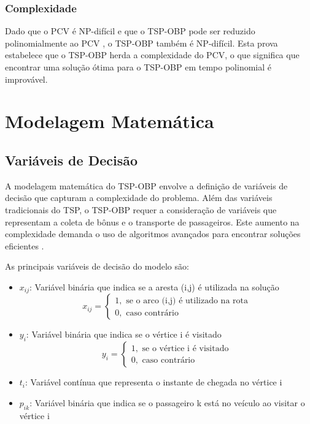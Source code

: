 \documentclass[12pt, a4paper]{report}
\begin{document}
\subsection{Complexidade}
Dado que o PCV é NP-difícil e que o TSP-OBP pode ser reduzido polinomialmente ao PCV , o TSP-OBP também é NP-difícil. Esta prova estabelece que o TSP-OBP herda a complexidade do PCV, o que significa que encontrar uma solução ótima para o TSP-OBP em tempo polinomial é improvável.

\chapter{Modelagem Matemática}

\section{Variáveis de Decisão}
A modelagem matemática do TSP-OBP envolve a definição de variáveis de decisão que capturam a complexidade do problema. Além das variáveis tradicionais do TSP, o TSP-OBP requer a consideração de variáveis que representam a coleta de bônus e o transporte de passageiros. Este aumento na complexidade demanda o uso de algoritmos avançados para encontrar soluções eficientes \cite{carvalho2022}.

As principais variáveis de decisão do modelo são:

\begin{itemize}
    \item $x_{ij}$: Variável binária que indica se a aresta (i,j) é utilizada na solução
    \begin{equation}
        x_{ij} = \begin{cases}
            1, \text{ se o arco (i,j) é utilizado na rota} \\
            0, \text{ caso contrário}
        \end{cases}
    \end{equation}

    \item $y_i$: Variável binária que indica se o vértice i é visitado
    \begin{equation}
        y_i = \begin{cases}
            1, \text{ se o vértice i é visitado} \\
            0, \text{ caso contrário}
        \end{cases}
    \end{equation}

    \item $t_i$: Variável contínua que representa o instante de chegada no vértice i

    \item $p_{ik}$: Variável binária que indica se o passageiro k está no veículo ao visitar o vértice i
\end{itemize}
\end{document}
